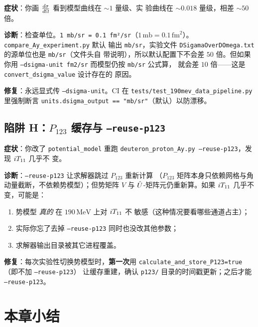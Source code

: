 \begin{pitfallbox}
\textbf{症状}：你画 \(\frac{d\sigma}{d\Omega}\) 看到模型曲线在 \(\sim 1\) 量级、实
验曲线在 \(\sim 0.018\) 量级，相差 \(\sim 50\) 倍。

\textbf{诊断}：检查单位。\texttt{1 mb/sr = 0.1 fm²/sr}（\(1\,\text{mb}
= 0.1\,\text{fm}^2\)）。\texttt{compare\_Ay\_experiment.py} 默认
输出 \texttt{mb/sr}，实验文件
\texttt{DSigamaOverDOmega.txt} 的源单位也是 \texttt{mb/sr}（文件头自
带说明），所以默认配置下不会差 \(50\) 倍。但如果你用
\texttt{--dsigma-unit fm2/sr} 而模型仍按 \texttt{mb/sr} 公式算，
就会差 \(10\) 倍——这是\texttt{convert\_dsigma\_value} 设计存在的
原因。

\textbf{修复}：永远显式传 \texttt{--dsigma-unit}。CI 在
\texttt{tests/test\_190mev\_data\_pipeline.py} 里强制断言
\texttt{units.dsigma\_output == "mb/sr"}（默认）以防漂移。
\end{pitfallbox}

\subsection{陷阱 H：\(P_{123}\) 缓存与 \texttt{--reuse-p123}}
\label{subsec:ch13-pitfall-p123-cache}

\begin{pitfallbox}
\textbf{症状}：你改了 \texttt{potential\_model} 重跑
\texttt{deuteron\_proton\_Ay.py --reuse-p123}，发现 \({i T_{11}}\) 几乎不
变。

\textbf{诊断}：\texttt{--reuse-p123} 让求解器跳过 \(P_{123}\) 重新计算
（\(P_{123}\) 矩阵本身只依赖网格与角动量截断，不依赖势模型）；但势矩阵
\(V\) 与 \(\hat{U}\)-矩阵元仍重新算。如果 \({i T_{11}}\) 几乎不变，可能是：
\begin{enumerate}
  \item 势模型 \emph{真的} 在 \(190\,\text{MeV}\) 上对 \({i T_{11}}\) 不
        敏感（这种情况要看哪些通道占主）；
  \item 实际你忘了去掉 \texttt{--reuse-p123} 同时也没改其他参数；
  \item 求解器输出目录被其它进程覆盖。
\end{enumerate}

\textbf{修复}：每次实验性切换势模型时，\textbf{第一次}用
\texttt{calculate\_and\_store\_P123=true}（即不加 \texttt{--reuse-p123}）
让缓存重建，确认 \texttt{p123/} 目录的时间戳更新；之后才能 \texttt{--reuse-p123}。
\end{pitfallbox}

\section*{本章小结}

